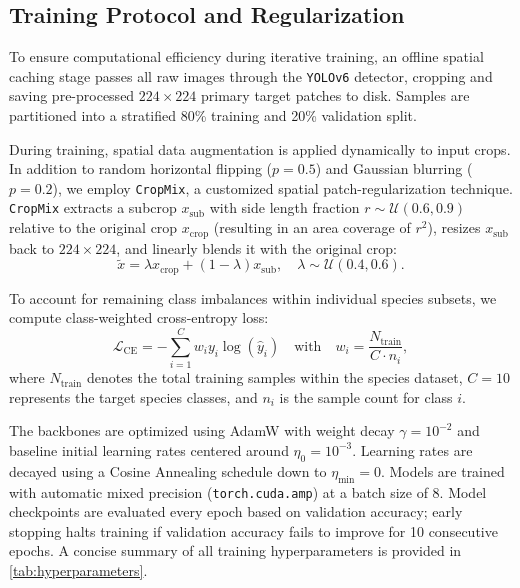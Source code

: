 \subsection{Training Protocol and Regularization}
\label{subsec:training_protocol}

To ensure computational efficiency during iterative training, an offline spatial caching stage passes all raw images through the \texttt{YOLOv6} detector, cropping and saving pre-processed $224 \times 224$ primary target patches to disk. Samples are partitioned into a stratified 80\% training and 20\% validation split.

During training, spatial data augmentation is applied dynamically to input crops. In addition to random horizontal flipping ($p=0.5$) and Gaussian blurring ($p=0.2$), we employ \texttt{CropMix}, a customized spatial patch-regularization technique. \texttt{CropMix} extracts a subcrop $x_{\text{sub}}$ with side length fraction $r \sim \mathcal{U}(0.6, 0.9)$ relative to the original crop $x_{\text{crop}}$ (resulting in an area coverage of $r^2$), resizes $x_{\text{sub}}$ back to $224 \times 224$, and linearly blends it with the original crop:
\begin{equation}
  \tilde{x} = \lambda x_{\text{crop}} + (1 - \lambda) x_{\text{sub}}, \quad \lambda \sim \mathcal{U}(0.4, 0.6) .
  \label{eq:cropmix}
\end{equation}

To account for remaining class imbalances within individual species subsets, we compute class-weighted cross-entropy loss:
\begin{equation}
  \mathcal{L}_{\text{CE}} = - \sum_{i=1}^{C} w_i y_i \log(\hat{y}_i) \quad \text{with} \quad w_i = \frac{N_{\text{train}}}{C \cdot n_i} ,
  \label{eq:class_weights}
\end{equation}
where $N_{\text{train}}$ denotes the total training samples within the species dataset, $C=10$ represents the target species classes, and $n_i$ is the sample count for class $i$.

The backbones are optimized using AdamW with weight decay $\gamma = 10^{-2}$ and baseline initial learning rates centered around $\eta_0 = 10^{-3}$. Learning rates are decayed using a Cosine Annealing schedule down to $\eta_{\text{min}} = 0$. Models are trained with automatic mixed precision (\texttt{torch.cuda.amp}) at a batch size of 8. Model checkpoints are evaluated every epoch based on validation accuracy; early stopping halts training if validation accuracy fails to improve for 10 consecutive epochs. A concise summary of all training hyperparameters is provided in \cref{tab:hyperparameters}.

